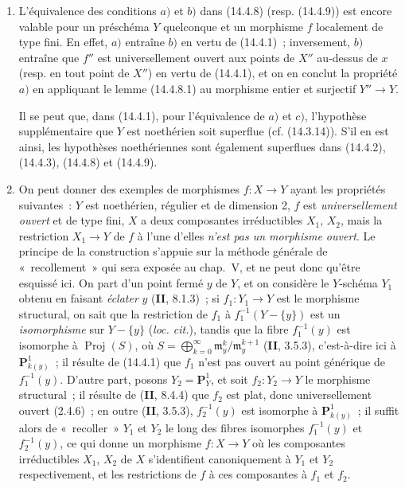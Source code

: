 \begin{remarks}[14.4.10]
\label{IV.14.4.10-fr}
\begin{enumerate}[label=(\roman*)]
  \item L'équivalence des conditions $a)$ et $b)$ dans (14.4.8) (resp. (14.4.9))
  est encore valable pour un préschéma $Y$ quelconque et un morphisme $f$
  localement de type fini. En effet, $a)$ entraîne $b)$ en vertu de (14.4.1)~;
  inversement, $b)$ entraîne que $f''$ est universellement ouvert aux points de
  $X''$ au-dessus de $x$ (resp. en tout point de $X''$) en vertu de (14.4.1), et
  on en conclut la propriété $a)$ en appliquant le lemme (14.4.8.1) au morphisme
  entier et surjectif $Y''\to Y$.

  Il se peut que, dans (14.4.1), pour l'équivalence de $a)$ et $c)$, l'hypothèse
  supplémentaire que $Y$ est noethérien soit superflue (cf. (14.3.14)). S'il en
  est ainsi, les hypothèses noethériennes sont également superflues dans (14.4.2),
  (14.4.3), (14.4.8) et (14.4.9).

  \item On peut donner des exemples de morphismes $f:X\to Y$ ayant les propriétés
  suivantes~: $Y$ est noethérien, régulier et de dimension 2, $f$ est
  \emph{universellement ouvert} et de type fini, $X$ a deux composantes
  irréductibles $X_1$, $X_2$, mais la restriction $X_1\to Y$ de $f$ à l'une
  d'elles \emph{n'est pas un morphisme ouvert}. Le principe de la construction
  s'appuie sur la méthode générale de «~recollement~» qui sera exposée au chap.~V,
  et ne peut donc qu'être esquissé ici. On part d'un point fermé $y$ de $Y$, et on
  considère le $Y$-schéma $Y_1$ obtenu en faisant \emph{éclater} $y$
  (\textbf{II}, 8.1.3)~; si $f_1:Y_1\to Y$ est le morphisme structural, on sait que
  la restriction de $f_1$ à $f_1^{-1}(Y-\{y\})$ est un \emph{isomorphisme} sur
  $Y-\{y\}$ (\emph{loc. cit.}), tandis que la fibre $f_1^{-1}(y)$ est isomorphe à
  $\operatorname{Proj}(S)$, où
  $S=\bigoplus_{k=0}^{\infty}\mathfrak m_y^k/\mathfrak m_y^{k+1}$
  (\textbf{II}, 3.5.3), c'est-à-dire ici à $\mathbf P^1_{k(y)}$~; il résulte de
  (14.4.1) que $f_1$ n'est pas ouvert au point générique de $f_1^{-1}(y)$. D'autre
  part, posons $Y_2=\mathbf P^1_Y$, et soit $f_2:Y_2\to Y$ le morphisme structural~;
  il résulte de (\textbf{II}, 8.4.4) que $f_2$ est plat, donc universellement ouvert
  (2.4.6)~; en outre (\textbf{II}, 3.5.3), $f_2^{-1}(y)$ est isomorphe à
  $\mathbf P^1_{k(y)}$~; il suffit alors de «~recoller~» $Y_1$ et $Y_2$ le long des
  fibres isomorphes $f_1^{-1}(y)$ et $f_2^{-1}(y)$, ce qui donne un morphisme
  $f:X\to Y$ où les composantes irréductibles $X_1$, $X_2$ de $X$ s'identifient
  canoniquement à $Y_1$ et $Y_2$ respectivement, et les restrictions de $f$ à ces
  composantes à $f_1$ et $f_2$.


\end{enumerate}
\end{remarks}
